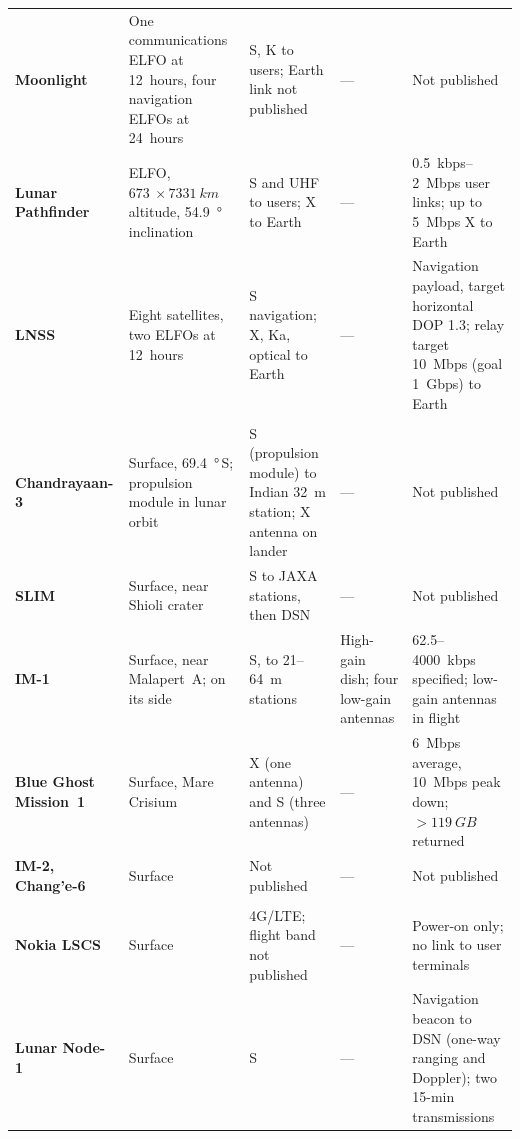 \documentclass{IEEEoj}
\begin{document}
\begin{table}[!t]
\begin{tabularx}{\textwidth}{@{}>{\raggedright\arraybackslash\bfseries}p{3.5cm}>{\raggedright\arraybackslash}p{3.3cm}>{\raggedright\arraybackslash}p{3.1cm}>{\raggedright\arraybackslash}p{1.5cm}>{\raggedright\arraybackslash}X}
Moonlight~\cite{esa_moonlight_overview,telespazio_moonlight,telespazio_moonlight_web} & One communications ELFO at \SI{12}{hours}, four navigation ELFOs at \SI{24}{hours} & S, K to users; Earth link not published & --- & Not published \\
Lunar Pathfinder~\cite{sstl_pathfinder_guide,sstl_pathfinder_mission,esa_pathfinder_2026} & ELFO, $\SI{673}{}\times\SI{7331}{km}$ altitude, \SI{54.9}{\degree} inclination & S and UHF to users; X to Earth & --- & \SI{0.5}{kbps}--\SI{2}{Mbps} user links; up to \SI{5}{Mbps} X to Earth \\
LNSS~\cite{jaxa_lnss} & Eight satellites, two ELFOs at \SI{12}{hours} & S navigation; X, Ka, optical to Earth & --- & Navigation payload, target horizontal DOP 1.3; relay target \SI{10}{Mbps} (goal \SI{1}{Gbps}) to Earth \\
\addlinespace[2pt]
\rowcolor{tabgroup}\multicolumn{5}{@{}l}{\emph{Landers, flown since 2023}}\\
Chandrayaan-3~\cite{isro_ch3_brochure,isro_ch3_details,esa_ch3_support2023} & Surface, \SI{69.4}{\degree}\,S; propulsion module in lunar orbit & S (propulsion module) to Indian \SI{32}{m} station; X antenna on lander & --- & Not published \\
SLIM~\cite{jaxa_slim_review2024} & Surface, near Shioli crater & S to JAXA stations, then DSN & --- & Not published \\
IM-1~\cite{im_fcc_icd2021,im_fcc_narrative2021,gopalswamy2026_rolses} & Surface, near Malapert~A; on its side & S, to \SI{21}{}--\SI{64}{m} stations & High-gain dish; four low-gain antennas & \SI{62.5}{}--\SI{4000}{kbps} specified; low-gain antennas in flight \\
Blue Ghost Mission~1~\cite{nssdca_bgm1,firefly_bgm1_14days2025} & Surface, Mare Crisium & X (one antenna) and S (three antennas) & --- & \SI{6}{Mbps} average, \SI{10}{Mbps} peak down; ${>}\SI{119}{GB}$ returned \\
IM-2, Chang'e-6~\cite{nssdca_im2,esa_three_moon2024} & Surface & Not published & --- & Not published \\
\addlinespace[2pt]
\rowcolor{tabgroup}\multicolumn{5}{@{}l}{\emph{Surface payloads, flown}}\\
Nokia LSCS~\cite{nokia_im2_outcome,nasa_grc_surface_3gpp_2025} & Surface & 4G/LTE; flight band not published & --- & Power-on only; no link to user terminals \\
Lunar Node-1~\cite{nasa_ln1,anzalone_ln1_2021} & Surface & S & --- & Navigation beacon to DSN (one-way ranging and Doppler); two 15-min transmissions \\

\end{tabularx}
\end{table}
\end{document}
